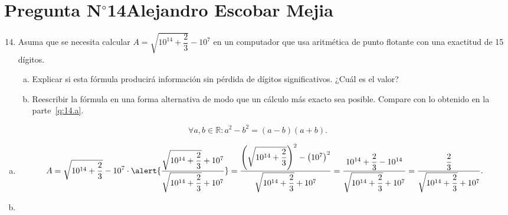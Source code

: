 \section{Pregunta N$^{\circ}$14\qquad Alejandro Escobar Mejia}

\begin{frame}
	\begin{enumerate}\setcounter{enumi}{13}
		\item

		      Asuma que se necesita calcular
		      \begin{math}
			      A=
			      \sqrt{10^{14}+\dfrac{2}{3}}-10^{7}
		      \end{math}
		      en un computador que usa aritmética de punto flotante con
		      una exactitud de 15 dígitos.

		      \begin{enumerate}[a)]
			      \item\label{q:14.a}

			      Explicar si esta fórmula producirá información sin
			      pérdida de dígitos significativos.
			      ¿Cuál es el valor?

			      \item\label{q:14.b}

			      Reescribir la fórmula en una forma alternativa de
			      modo que un cálculo más exacto sea posible.
			      Compare con lo obtenido en la parte~\eqref{q:14.a}.
		      \end{enumerate}
	\end{enumerate}

	\begin{solution}

		\begin{equation*}
			\forall a,b\in\mathbb{R}:
			a^{2}-b^{2}=
			\left(a-b\right)
			\left(a+b\right).
		\end{equation*}

		\begin{enumerate}[a)]
			\item
 \begin{equation*}
				      A=
				      \sqrt{10^{14}+\dfrac{2}{3}} - 10^{7}\cdot
				      \alert{
				      \dfrac{
				      \sqrt{10^{14}+\dfrac{2}{3}}+10^{7}
				      }{
				      \sqrt{10^{14}+\dfrac{2}{3}}+10^{7}
				      }
				      }=
				      \dfrac{
				      \left(
				      \sqrt{10^{14}+\dfrac{2}{3}}
				      \right)^{2}
				      -{\left(
				      10^{7}
				      \right)}^{2}
				      }{
				      \sqrt{10^{14}+\dfrac{2}{3}}+10^{7}
				      }
				      =
				      \dfrac{
				      10^{14}+\dfrac{2}{3}-10^{14}
				      }{
				      \sqrt{10^{14}+\dfrac{2}{3}}+10^{7}
				      }=
				      \dfrac{\dfrac{2}{3}}{
				      \sqrt{10^{14}+\dfrac{2}{3}}+10^{7}
				      }.
			      \end{equation*}
			\item


\end{enumerate}
\end{solution}
\end{frame}
